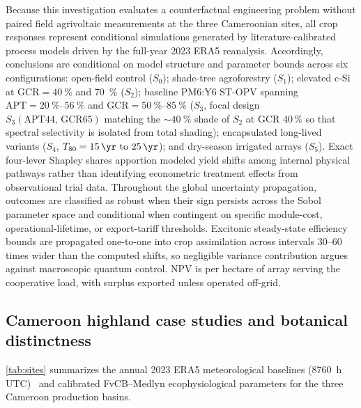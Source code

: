 \documentclass[preprint,12pt,a4paper]{elsarticle}
\begin{document}
Because this investigation evaluates a counterfactual engineering problem without paired field agrivoltaic measurements at the three Cameroonian sites, all crop responses represent conditional simulations generated by literature-calibrated process models driven by the full-year 2023 ERA5 reanalysis. Accordingly, conclusions are conditional on model structure and parameter bounds across six configurations: open-field control ($S_0$); shade-tree agroforestry ($S_1$); elevated c-Si at $\mathrm{GCR}=\qty{40}{\percent}$ and \qty{70}{\percent} ($S_2$); baseline PM6:Y6 ST-OPV spanning $\mathrm{APT}=\qtyrange{20}{56}{\percent}$ and $\mathrm{GCR}=\qtyrange{50}{85}{\percent}$ ($S_3$, focal design $S_3(\mathrm{APT44,\,GCR65})$ matching the $\sim\qty{40}{\percent}$ shade of $S_2$ at GCR 40\,\% so that spectral selectivity is isolated from total shading); encapsulated long-lived variants ($S_4$, $T_{80}=\qtyrange{15}{25}{\yr}$); and dry-season irrigated arrays ($S_5$). Exact four-lever Shapley shares apportion modeled yield shifts among internal physical pathways rather than identifying econometric treatment effects from observational trial data. Throughout the global uncertainty propagation, outcomes are classified as robust when their sign persists across the Sobol parameter space and conditional when contingent on specific module-cost, operational-lifetime, or export-tariff thresholds. Excitonic steady-state efficiency bounds are propagated one-to-one into crop assimilation across intervals \numrange{30}{60} times wider than the computed shifts, so negligible variance contribution argues against macroscopic quantum control. NPV is per hectare of array serving the cooperative load, with surplus exported unless operated off-grid.

\subsection{Cameroon highland case studies and botanical distinctness}
\label{sec:sites}

\cref{tab:sites} summarizes the annual 2023 ERA5 meteorological baselines (\qty{8760}{\hour} UTC)~\cite{Hersbach2020} and calibrated FvCB--Medlyn ecophysiological parameters for the three Cameroon production basins.
\end{document}
